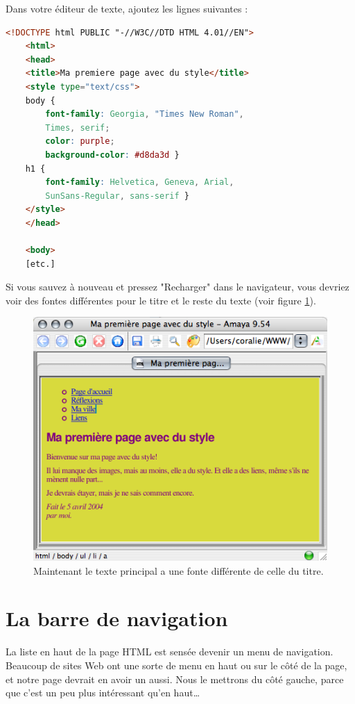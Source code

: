 Dans votre éditeur de texte, ajoutez les lignes suivantes : 
\begin{lstlisting}[language=html]
	<!DOCTYPE html PUBLIC "-//W3C//DTD HTML 4.01//EN">
	<html>
	<head>
	<title>Ma premiere page avec du style</title>
	<style type="text/css">
	body {
		font-family: Georgia, "Times New Roman",
		Times, serif;
		color: purple;
		background-color: #d8da3d }
	h1 {
		font-family: Helvetica, Geneva, Arial,
		SunSans-Regular, sans-serif }
	</style>
	</head>
	
	<body>
	[etc.]
\end{lstlisting}
Si vous sauvez à nouveau et pressez "Recharger" dans le navigateur, vous devriez voir des fontes différentes pour le titre et le reste du texte (voir figure \ref{fig:screen4}).
\begin{figure}[t]
	\begin{center}
		\caption{Maintenant le texte principal a une fonte différente de celle du titre.  }
		\label{fig:screen4}
		\includegraphics{voronin/img/capture3.png}	
	\end{center}
\end{figure} 
\section{La barre de navigation}
La liste en haut de la page HTML est sensée devenir un menu de navigation. Beaucoup de sites Web ont une sorte de menu en haut ou sur le côté de la page, et notre page devrait en avoir un aussi. Nous le mettrons du côté gauche, parce que c'est un peu plus intéressant qu'en haut…

